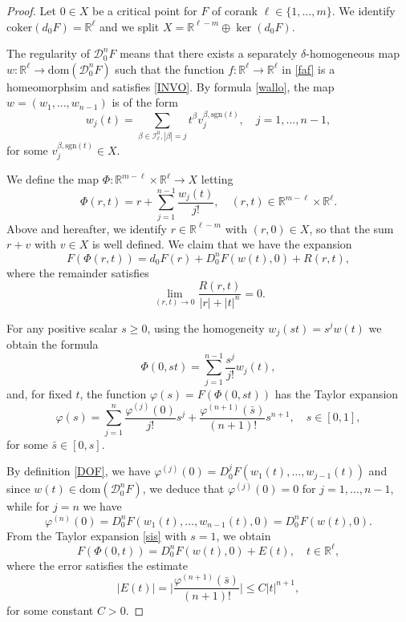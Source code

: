 \documentclass[12pt, reqno]{amsart}
\theoremstyle{plain}
\theoremstyle{definition}
\theoremstyle{remark}
\numberwithin{equation}{section}
\newcommand{\R}{\mathbb{R}}
\renewcommand{\phi}{\varphi}
\newcommand{\0}{\theta}
\renewcommand{\b}{\beta}
\newcommand{\1}{{-1}}
\newcommand{\sgn}{\mathrm{sgn}}
\renewcommand{\l}{\ell}
\renewcommand{\=}{\coloneqq}
\renewcommand{\.}{\dots}
\newcommand{\mc}{\mathcal}
\newcommand{\coker}{\mathrm{coker}}
\newcommand{\dom}{\mathrm{dom}}
\newcommand{\be}{\begin{equation}}
\newcommand{\ee}{\end{equation}}
\begin{document}
\begin{proof}  Let $0\in X$ be a critical point for $F$  of corank $\l\in\{1,\dots,m\}$.
   We identify $\coker(d_0 F)=\R^\l$ and we split $X=\R^{\l-m} \oplus \ker(d_0F)$.
   
   
   {\color{black}
   The regularity of    $ \mc D_0^n F$  means that there exists  a separately $\delta$-homogeneous map  $w:\R^\l \to \dom(\mc D_0^n F)$  
      such that  the function $f: \R^\l\to\R^\l $ in \eqref{faf} is a homeomorphsim and satisfies \eqref{INVO}.
   By formula \eqref{wallo}, the map $w =(w_1,\dots,w_{n-1})$ is of the form 
	\[
	w_j(t)= \sum_{\b\in \mathscr I_\l^0,|\b|=j} t^\b v_j^{\b,\sgn(t)} ,\quad j=1,\dots,n-1,
	\]
	for some $v_j^{\b,\sgn(t)}\in X$.
	}
	
	
	  
	  



   	We define the map $\Phi:\R^{m-\l}\times \R^\l\to X$ letting  
    \[
		\Phi(r,t)= r +  \sum_{j=1}^{n-1} \frac{w_j(t)}{j!} ,
		\quad 
		(r,t)\in \R^{m-\l}\times \R^\l.
	\]
Above and hereafter, we identify $r\in \R^{\l-m}$ with $(r,0)\in  X$, so that the sum $r+v$ with $v\in X$ is well defined.
We   claim that we have the  expansion
	\begin{equation}\label{expa}
			F\left(\Phi(r,t)\right)=
			d_0F(r)+D_0^n F( w (t),0) + R(r, t),
	\end{equation}
where the remainder  satisfies 
\be\label{eq:remlow2}
	\lim_{(r,t)\to 0} \frac{R(r,t)}{|r|+|t|^n} = 0.
\ee




For any positive scalar $s\geq0$, using the homogeneity $w_j(st)= s^j w(t)$ we obtain the formula 
  \[
  \Phi(0,s t)= %
  \sum_{j=1}^{n-1}\frac {s^j}{j!} w_j(t),
  \]
and, for fixed $t$, the function $\phi(s) =F(\Phi(0,st))$ has the Taylor expansion
  \begin{equation} \label{sis}
       \phi(s) =\sum_{j=1}^n \frac{\phi^{(j)} (0) }{j!} s^j + \frac{\phi^{(n+1)} (\bar s) }{(n+1) !}  s^{n+1} ,\quad s\in[0,1] ,
  \end{equation}
  for some $\bar s \in [0,s]$.
  
  By   definition \eqref{DOF}, we have  $\phi^{(j)} (0)  = D^j_0 F(w_1(t),\dots,w_{j-1}(t))$ and since   $w(t) \in \dom(\mc D_0^n F)$, we deduce that 
$
\phi^{(j)} (0) =0$ for $j=1,\dots, n-1$, while for $j=n$ we have
\[
\phi^{(n)} (0) = D^n_0 F(w_1(t),\dots,w_{n-1}(t),0)=D^n_0 F(w(t),0).
\]
From the Taylor expansion \eqref{sis} with  $s=1$, we obtain
\begin{equation}
\label{ERRO}
F(\Phi(0,t) )= D^n_0 F(w(t),0 ) +   E(t),\quad t\in\R^\l,
\end{equation}
where the error satisfies the estimate
\begin{equation}
\label{ERROS}
  |E(t)| =\Big|  \frac{\phi^{(n+1)} (\bar s) }{(n+1) !} \Big| \leq C|t|^{n+1},
\end{equation}
for some constant $C>0$.




\end{proof}
\end{document}
